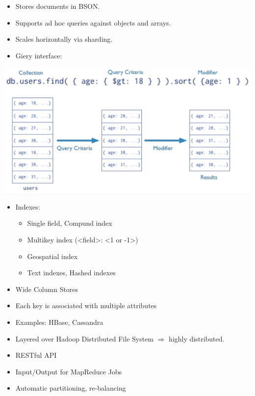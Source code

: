 \begin{breakbox}
\begin{itemize}
	\item Stores documents in BSON.
	\item Supports ad hoc queries against objects and arrays.
	\item Scales horizontally via sharding.
	\item Giery interface:
\end{itemize}
\begin{center}
	\includegraphics[width=.12\textwidth]{slides_images/mongo_db_query}
\end{center}
\begin{itemize}
	\item Indexes:
		\begin{itemize}
			\item Single field, Compund index
			\item Multikey index (<field>: <1 or -1>)
			\item Geospatial index
			\item Text indexes, Hashed indexes
		\end{itemize}
\end{itemize}
\end{breakbox}

\begin{breakbox}
\begin{itemize}
	\item Wide Column Stores
	\item Each key is associated with multiple attributes
	\item Examples: HBase, Cassandra
\end{itemize}
\end{breakbox}

\begin{breakbox}
\begin{itemize}
	\item Layered over Hadoop Distributed File System $\Rightarrow$ highly distributed.
	\item RESTful API
	\item Input/Output for MapReduce Jobs
	\item Automatic partitioning, re-balancing
\end{itemize}
\end{breakbox}


